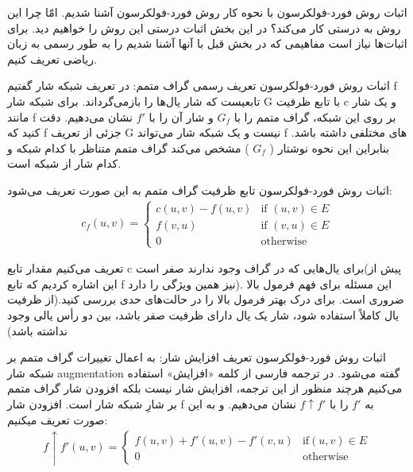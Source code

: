 
\begin{itemframe}{اثبات روش فورد-فولکرسون}
\itm
با نحوه کار روش فورد-فولکرسون آشنا شدیم. امّا چرا این روش به درستی کار می‌کند؟
\itm
در این بخش اثبات درستی این روش را خواهیم دید. برای اثبات‌ها نیاز است مفاهیمی که در بخش قبل با آنها آشنا شدیم را به طور رسمی به زبان ریاضی تعریف کنیم.
\end{itemframe}


\begin{itemframe}{اثبات روش فورد-فولکرسون}
\itm
تعریف رسمی گراف متمم:
\itm
در تعریف شبکه شار گفتیم f تابعیست که شار یال‌ها را بازمی‌گرداند. برای شبکه شار G با تابع ظرفیت c و یک شار مانند f بر روی این شبکه، گراف متمم را با
$G_f$
و شار آن را با
$f'$
 نشان می‌دهیم.
\itm
 دقت کنید که f جزئی از تعریف G نیست و یک شبکه شار می‌تواند f های مختلفی داشته باشد. بنابراین این نحوه نوشتار (
$G_f$
) مشخص می‌کند گراف متمم متناظر با کدام شبکه و کدام شار از شبکه است.
\end{itemframe}


\begin{itemframe}{اثبات روش فورد-فولکرسون}
\itm
تابع ظرفیت گراف متمم به این صورت تعریف می‌شود:
\begin{align}
c_f(u, v)=
\begin{cases}
c(u, v) - f(u, v) & \text{if } (u, v) \in E\\
f(v, u) & \text{if } (v, u) \in E\\
0 & \text{otherwise}
\end{cases}
\label{res-net-cap}
\end{align}

\itm
تعریف می‌کنیم مقدار تابع c برای یال‌هایی که در گراف وجود ندارند صفر است(پیش از این اشاره کردیم که تابع f نیز همین ویژگی را دارد). این مسئله برای فهم فرمول بالا ضروری است. برای درک بهتر فرمول بالا را در حالت‌های حدی بررسی کنید.(از ظرفیت یال کاملاً استفاده شود، شار یک یال دارای ظرفیت صفر باشد، بین دو رأس یالی وجود نداشته باشد)

\end{itemframe}


\begin{itemframe}{اثبات روش فورد-فولکرسون}
\itm
تعریف افزایش شار:
\itm
به اعمال تغییرات گراف متمم بر شبکه شار augmentation گفته می‌شود. در ترجمه فارسی از کلمه «افزایش» استفاده می‌کنیم هرچند منظور از این ترجمه، افزایش شار نیست بلکه افزودن شار گراف متمم بر شارِ شبکه شار است.
\itm
افزودن شار f به
$f'$
را با
$f \uparrow f'$
نشان می‌دهیم. و به این صورت تعریف میکنیم:
\begin{align}
f \uparrow f'(u, v)=
\begin{cases}
f(u, v)+f'(u, v)-f'(v, u)& \text{if} (u, v) \in E\\
0 &\text{otherwise}
\end{cases}
\label{aug-flow-def}
\end{align}
\end{itemframe}


